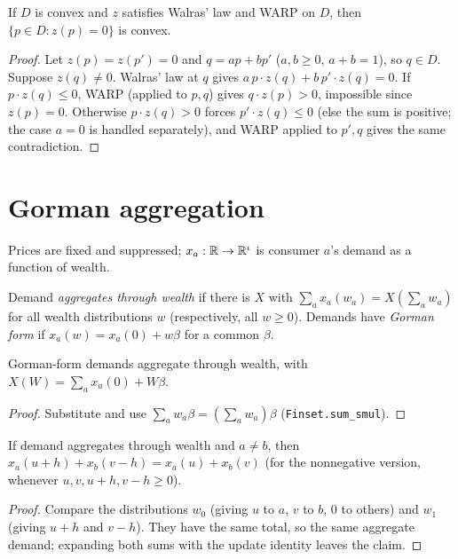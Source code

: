 \begin{theorem}
\label{thm:warp_convex}
\leanok
{}
If $D$ is convex and $z$ satisfies Walras' law and WARP on $D$, then $\{p \in D : z(p) = 0\}$ is convex.
\end{theorem}
\begin{proof}
\leanok
Let $z(p) = z(p') = 0$ and $q = ap + bp'$ ($a, b \ge 0$, $a + b = 1$), so $q \in D$. Suppose $z(q) \ne 0$. Walras' law
at $q$ gives $a\, p\cdot z(q) + b\, p' \cdot z(q) = 0$. If $p \cdot z(q) \le 0$, WARP (applied to $p, q$) gives
$q \cdot z(p) > 0$, impossible since $z(p) = 0$. Otherwise $p \cdot z(q) > 0$ forces $p' \cdot z(q) \le 0$ (else the sum
is positive; the case $a = 0$ is handled separately), and WARP applied to $p', q$ gives the same contradiction.
\end{proof}

\section{Gorman aggregation}
\label{sec:gorman}

Prices are fixed and suppressed; $x_a : \mathbb{R} \to \mathbb{R}^\iota$ is consumer $a$'s demand as a function of wealth.

\begin{definition}
\label{def:gorman}
\leanok
Demand \emph{aggregates through wealth} if there is $X$ with $\sum_a x_a(w_a) = X(\sum_a w_a)$ for all wealth
distributions $w$ (respectively, all $w \ge 0$). Demands have \emph{Gorman form} if $x_a(w) = x_a(0) + w \beta$ for a
common $\beta$.
\end{definition}

\begin{theorem}
\label{thm:gorman_if}
\leanok
{}
Gorman-form demands aggregate through wealth, with $X(W) = \sum_a x_a(0) + W\beta$.
\end{theorem}
\begin{proof}
\leanok
Substitute and use $\sum_a w_a \beta = (\sum_a w_a)\beta$ (\texttt{Finset.sum\_smul}).
\end{proof}

\begin{lemma}
\label{lem:gorman_transfer}
\leanok
{}
If demand aggregates through wealth and $a \ne b$, then $x_a(u + h) + x_b(v - h) = x_a(u) + x_b(v)$ (for the
nonnegative version, whenever $u, v, u+h, v-h \ge 0$).
\end{lemma}
\begin{proof}
\leanok
Compare the distributions $w_0$ (giving $u$ to $a$, $v$ to $b$, $0$ to others) and $w_1$ (giving $u+h$ and $v-h$). They
have the same total, so the same aggregate demand; expanding both sums with the update identity leaves the claim.
\end{proof}

